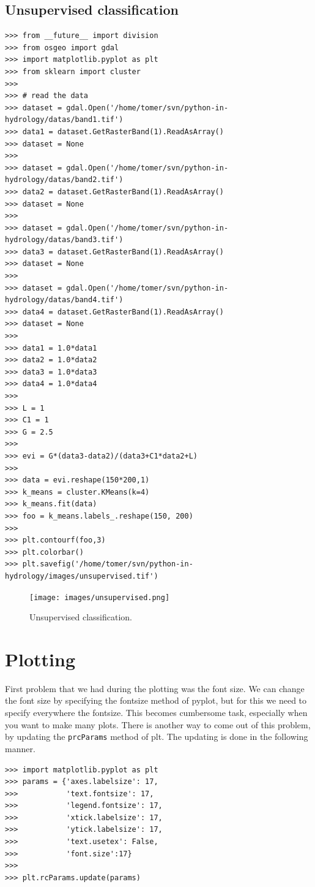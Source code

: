 \documentclass[10pt]{book}
\begin{document}
\section{Unsupervised classification}
\beforeverb \begin{verbatim}
>>> from __future__ import division
>>> from osgeo import gdal
>>> import matplotlib.pyplot as plt
>>> from sklearn import cluster
>>> 
>>> # read the data
>>> dataset = gdal.Open('/home/tomer/svn/python-in-hydrology/datas/band1.tif')
>>> data1 = dataset.GetRasterBand(1).ReadAsArray()
>>> dataset = None
>>> 
>>> dataset = gdal.Open('/home/tomer/svn/python-in-hydrology/datas/band2.tif')
>>> data2 = dataset.GetRasterBand(1).ReadAsArray()
>>> dataset = None
>>> 
>>> dataset = gdal.Open('/home/tomer/svn/python-in-hydrology/datas/band3.tif')
>>> data3 = dataset.GetRasterBand(1).ReadAsArray()
>>> dataset = None
>>> 
>>> dataset = gdal.Open('/home/tomer/svn/python-in-hydrology/datas/band4.tif')
>>> data4 = dataset.GetRasterBand(1).ReadAsArray()
>>> dataset = None
>>> 
>>> data1 = 1.0*data1
>>> data2 = 1.0*data2
>>> data3 = 1.0*data3
>>> data4 = 1.0*data4
>>> 
>>> L = 1
>>> C1 = 1
>>> G = 2.5
>>> 
>>> evi = G*(data3-data2)/(data3+C1*data2+L)
>>> 
>>> data = evi.reshape(150*200,1)
>>> k_means = cluster.KMeans(k=4)
>>> k_means.fit(data) 
>>> foo = k_means.labels_.reshape(150, 200)
>>> 
>>> plt.contourf(foo,3)
>>> plt.colorbar()
>>> plt.savefig('/home/tomer/svn/python-in-hydrology/images/unsupervised.tif')
\end{verbatim} \afterverb

\beforefig
\begin{figure}[h!]
  \centering
    \texttt{[image: images/unsupervised.png]}
  \caption{Unsupervised classification.}
   \label{fig:unsuper}
\end{figure}
\afterfig

\chapter{Plotting}
First problem that we had during the plotting was the font size. We can change the font size by specifying the fontsize method of pyplot, but for this we need to specify everywhere the fontsize. This becomes cumbersome task, especially when you want to make many plots. There is another way to come out of this problem, by updating the \verb"prcParams" method of plt. The updating is done in the following manner. 

\beforeverb
\begin{verbatim}
>>> import matplotlib.pyplot as plt
>>> params = {'axes.labelsize': 17, 
>>>           'text.fontsize': 17,
>>>           'legend.fontsize': 17,
>>>           'xtick.labelsize': 17,
>>>           'ytick.labelsize': 17,
>>>           'text.usetex': False,
>>>           'font.size':17}
>>> 
>>> plt.rcParams.update(params)
\end{verbatim}
\afterverb
{}
\end{document}
